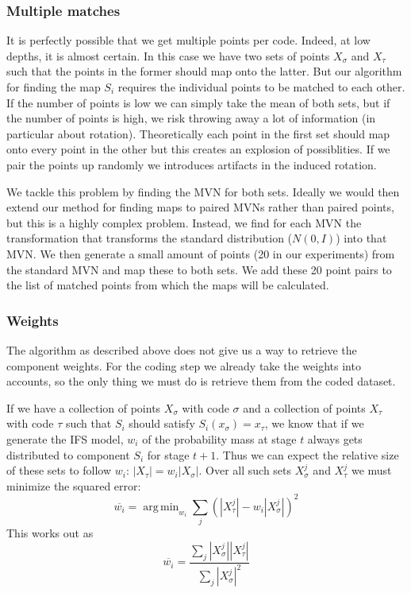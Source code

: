 \documentclass[10pt,a4paper,oneside]{article}
\theoremstyle{definition}
\DeclareMathOperator*{\argmin}{arg\,min}
\begin{document}

\subsubsection*{Multiple matches}

It is perfectly possible that we get multiple points per code. Indeed, at low depths, it is almost certain. In this case we have two sets of points $X_\sigma$ and $X_\tau$ such that the points in the former should map onto the latter. But our algorithm for finding the map $S_i$ requires the individual points to be matched to each other. If the number of points is low we can simply take the mean of both sets, but if the number of points is high, we risk throwing away a lot of information (in particular about rotation). Theoretically each point in the first set should map onto every point in the other but this creates an explosion of possiblities. If we pair the points up randomly we introduces artifacts in the induced rotation.

We tackle this problem by finding the MVN for both sets. Ideally we would then extend our method for finding maps to paired MVNs rather than paired points, but this is a highly complex problem. Instead, we find for each MVN the transformation that transforms the standard distribution ($N(0, I)$) into that MVN. We then generate a small amount of points (20 in our experiments) from the standard MVN and map these to both sets. We add these 20 point pairs to the list of matched points from which the maps will be calculated. 

\subsubsection*{Weights}

The algorithm as described above does not give us a way to retrieve the component weights. For the coding step we already take the weights into accounts, so the only thing we must do is retrieve them from the coded dataset. 

If we have a collection of points $X_\sigma$ with code $\sigma$ and a collection of points $X_\tau$ with code $\tau$ such that $S_i$ should satisfy $S_i(x_\sigma) = x_\tau$, we know that if we generate the IFS model, $w_i$ of the probability mass at stage $t$ always gets distributed to component $S_i$ for stage $t + 1$. Thus we can expect the relative size of these sets to follow $w_i$: $|X_\tau| = w_i |X_\sigma|$. Over all such sets $X_\sigma^j$ and $X_\tau^j$ we must minimize the squared error:
\[
\overline{w_i} = \argmin_{w_i} \sum_{j} \left( |X_\tau^j| - w_i |X_\sigma^j| \right)^2
\]
This works out as 
\[
\overline{w_i} = \frac{\sum_{j}|X_\sigma^j||X_\tau^j|}{\sum_{j}|X_\sigma^j|^2}
\]
\end{document}

